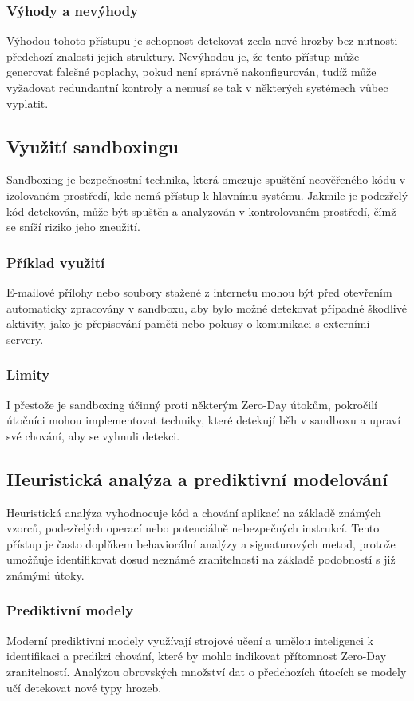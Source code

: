 \documentclass[11pt, conference, a4paper]{IEEEtran}
\begin{document}
\subsubsection{Výhody a nevýhody} Výhodou tohoto přístupu je schopnost detekovat zcela nové hrozby bez nutnosti předchozí znalosti jejich struktury. Nevýhodou je, že tento přístup může generovat falešné poplachy, pokud není správně nakonfigurován, tudíž m\r uže vyžadovat redundantní kontroly a nemusí se tak v některých systémech v\r ubec vyplatit.
\subsection{Využití sandboxingu \cite{Sandboxing}}
Sandboxing je bezpečnostní technika, která omezuje spuštění neověřeného kódu v izolovaném prostředí, kde nemá přístup k hlavnímu systému. Jakmile je podezřelý kód detekován, může být spuštěn a analyzován v kontrolovaném prostředí, čímž se sníží riziko jeho zneužití.

\subsubsection{Příklad využití} E-mailové přílohy nebo soubory stažené z internetu mohou být před otevřením automaticky zpracovány v sandboxu, aby bylo možné detekovat případné škodlivé aktivity, jako je přepisování paměti nebo pokusy o komunikaci s externími servery.
\subsubsection{Limity} I přestože je sandboxing účinný proti některým Zero-Day útokům, pokročilí útočníci mohou implementovat techniky, které detekují běh v sandboxu a upraví své chování, aby se vyhnuli detekci.
\subsection{Heuristická analýza a prediktivní modelování \cite{HeuristicAnalysis}}
Heuristická analýza vyhodnocuje kód a chování aplikací na základě známých vzorců, podezřelých operací nebo potenciálně nebezpečných instrukcí. Tento přístup je často doplňkem behaviorální analýzy a signaturových metod, protože umožňuje identifikovat dosud neznámé zranitelnosti na základě podobností s již známými útoky.

\subsubsection{Prediktivní modely} Moderní prediktivní modely využívají strojové učení a umělou inteligenci k identifikaci a predikci chování, které by mohlo indikovat přítomnost Zero-Day zranitelností. Analýzou obrovských množství dat o předchozích útocích se modely učí detekovat nové typy hrozeb.
\end{document}
